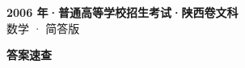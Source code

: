 \documentclass[zihao=-4, a4paper]{ctexart}
\begin{document}
\begin{center}
  {\Large\bfseries 2006 年·普通高等学校招生考试·陕西卷文科}\\[4pt]
  {\large 数学 · 简答版}
\end{center}
\medskip
{}

\clearpage
{}
\begin{center}{\Large\bfseries 答案速查}\end{center}
\medskip

\end{document}
